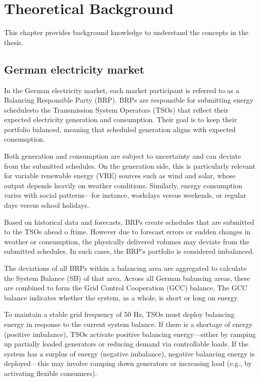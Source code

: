 \documentclass[class=scrbook, crop=false]{standalone}
\begin{document}


\chapter{Theoretical Background}
\label{Chapter::Theoretical_Background} %
This chapter provides background knowledge to understand the concepts in the thesis.

\section{German electricity market}
\label{Section::German_Electricity_Market}

In the German electricity market, each market participant is referred to as a Balancing Responsible Party (BRP). BRPs are responsible for submitting energy schedulesto the Transmission System Operators (TSOs) that reflect their expected electricity generation and consumption.
Their goal is to keep their portfolio balanced, meaning that scheduled generation aligns with expected consumption.

Both generation and consumption are subject to uncertainty and can deviate from the submitted schedules. On the generation side, this is particularly relevant for variable renewable energy (VRE) sources such as wind and solar, whose output depends heavily on weather conditions. Similarly, energy consumption varies with social patterns—for instance, workdays versus weekends, or regular days versus school holidays. 

Based on historical data and forecasts, BRPs create schedules that are submitted to the TSOs ahead o ftime. However due to forecast errors or sudden changes in weather or consumption, the physically delivered volumes may deviate from the submitted schedules. In such cases, the BRP’s portfolio is considered imbalanced. 

The deviations of all BRPs within a balancing area are aggregated to calculate the System Balance (SB) of that area. Across all German balancing areas, these are combined to form the Grid Control Cooperation (GCC) balance. The GCC balance indicates whether the system, as a whole, is short or long on energy.

To maintain a stable grid frequency of 50 Hz, TSOs must deploy balancing energy in response to the current system balance. If there is a shortage of energy (positive imbalance), TSOs activate positive balancing energy—either by ramping up partially loaded generators or reducing demand via controllable loads. If the system has a surplus of  energy (negative imbalance), negative balancing energy is deployed—this may involve ramping down generators or increasing load (e.g., by activating flexible consumers). 
\end{document}
